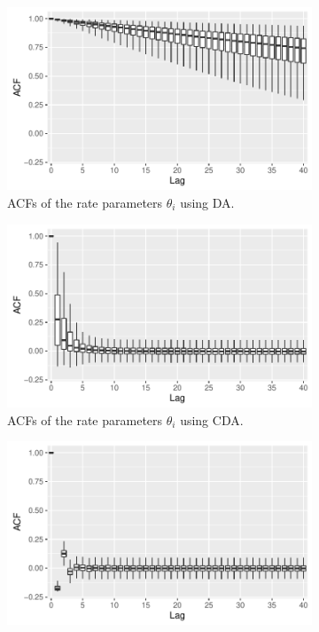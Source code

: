 \documentclass[12pt]{article}
\begin{document}
 \begin{figure}[H]
   \begin{subfigure}[b]{0.32\textwidth}
 \includegraphics[width=1\textwidth]{binomial_random_acf_da.pdf}
 \caption{ACFs of the rate parameters $\theta_i$ using DA.}
 \end{subfigure}
  \hfill 
 \begin{subfigure}[b]{0.32\textwidth}
 \includegraphics[width=1\textwidth]{binomial_random_acf_cda.pdf}
 \caption{ACFs of the rate parameters $\theta_i$ using CDA.}
 \end{subfigure} 
   \hfill 
 \begin{subfigure}[b]{0.32\textwidth}
 \includegraphics[width=1\textwidth]{binomial_random_acf_hmc.pdf}

\end{subfigure}
\end{figure}
\end{document}

